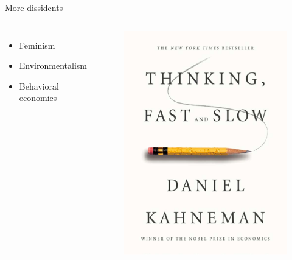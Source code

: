 \documentclass{beamer}
\begin{document}
\begin{frame}{More dissidents}
\begin{columns}[onlytextwidth]
\begin{itemize}
    \item Feminism %
    \item Environmentalism %
    \item Behavioral economics
\end{itemize}
\begin{figure}
    \centering
    \includegraphics[width=\textwidth]{../img/thinking-fast-and-slow.png}
\end{figure}
\end{columns}
\end{frame}
\end{document}
